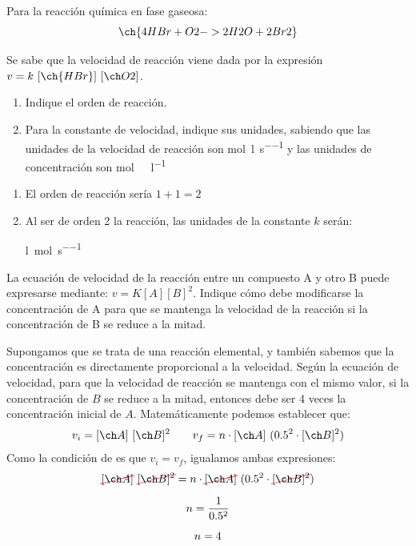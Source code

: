 \begin{exerciseEVAU}
    Para la reacción química en fase gaseosa:
    \begin{equation*}
        \ch{4 HBr + O2 -> 2 H2O + 2 Br2}
    \end{equation*}

    Se sabe que la velocidad de reacción viene dada por la expresión $v = k\ [\ch{HBr}]\ [\formula{O2}]$.
    \begin{enumerate}[label=\letraminuscula]
        \item Indique el orden de reacción.
        \item Para la constante de velocidad, indique sus unidades, sabiendo que las unidades de la velocidad de reacción son \unit{\mole\per\litre\per\s} y las unidades de concentración son \si{\mole\ \litre^{-1}}
    \end{enumerate}

    \begin{solu}

        \begin{enumerate}[label=\letraminuscula]
            \item El orden de reacción sería $1+1 = 2$
            \item Al ser de orden 2 la reacción, las unidades de la constante $k$ serán:

            \si{\litre\per\mole\per\s}
        \end{enumerate}
    \end{solu}
\end{exerciseEVAU}

\begin{exerciseEVAU}
    La ecuación de velocidad de la reacción entre un compuesto A y otro B puede expresarse mediante: $v = K [A][B]^2$.
    Indique cómo debe modificarse la concentración de A para que se mantenga la velocidad de la reacción si la concentración de B se reduce a la mitad.
    \begin{solu}

        Supongamos que se trata de una reacción elemental, y también sabemos que la concentración es directamente proporcional a la velocidad.
        Según la ecuación de velocidad, para que la velocidad de reacción se mantenga con el mismo valor, si la concentración de $B$ se reduce a la mitad, entonces  debe ser 4 veces la concentración inicial de $A$.
        Matemáticamente podemos establecer que:
        \begin{equation*}
            v_i = \conc{A}\ \conc{B}^2 \qquad v_f = n\cdot \conc{A}\ (0.5^2\cdot \conc{B}^2)
        \end{equation*}
        Como la condición de es que $v_i = v_f$, igualamos ambas expresiones:
        \begin{gather*}
            \cancelred{\conc{A}}\ \cancelred{\conc{B}^2} = n\cdot \cancelred{\conc{A}}\ (0.5^2\cdot \cancelred{\conc{B}^2}) \separ
            n = \dfrac{1}{0.5^2}\separ
            n = 4
        \end{gather*}

    \end{solu}
\end{exerciseEVAU}

